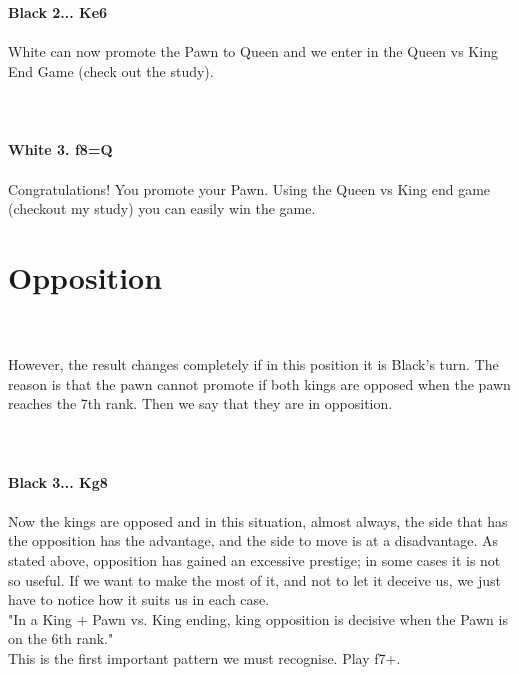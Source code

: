\documentclass{article}
\begin{document}

\\
\\
\textbf{Black 2... Ke6}\\
\\
White can now promote the Pawn to Queen and we enter in the Queen vs King End Game (check out the study).\\
\\

\\
\\
\textbf{White 3. f8=Q}\\
\\
Congratulations! You promote your Pawn. Using the Queen vs King end game (checkout my study) you can easily win the game.\section{ Opposition}

\\
\\
However, the result changes completely if in this position it is Black's turn. The reason is that the pawn cannot promote if both kings are opposed when the pawn reaches the 7th rank. Then we say that they are in opposition.\\
\\

\\
\\
\textbf{Black 3... Kg8}\\
\\
Now the kings are opposed and in this situation, almost always, the side that has the opposition has the advantage, and the side to move is at a disadvantage. As stated above, opposition has gained an excessive prestige; in some cases it is not so useful. If we want to make the most of it, and not to let it deceive us, we just have to notice how it suits us in each case.\\"In a King + Pawn vs. King ending, king opposition is decisive when the Pawn is on the 6th rank."\\This is the first important pattern we must recognise. Play f7+.\\
\\

\end{document}
